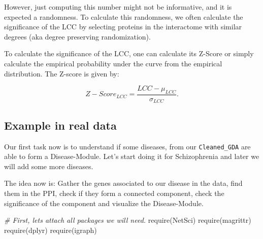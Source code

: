 \documentclass[
]{book}
\newenvironment{Shaded}{\begin{snugshade}}{\end{snugshade}}
\newcommand{\CommentTok}[1]{\textcolor[rgb]{0.56,0.35,0.01}{\textit{#1}}}
\newcommand{\FunctionTok}[1]{\textcolor[rgb]{0.00,0.00,0.00}{#1}}
\newcommand{\NormalTok}[1]{#1}
\begin{document}
However, just computing this number might not be informative, and it is expected a randomness. To calculate this randomness, we often calculate the significance of the LCC by selecting proteins in the interactome with similar degrees (aka degree preserving randomization).

To calculate the significance of the LCC, one can calculate its Z-Score or simply calculate the empirical probability under the curve from the empirical distribution. The Z-score is given by:

\[
Z-Score_{LCC} = \frac{LCC - \mu_{LCC}}{\sigma_{LCC}}.
\]

\hypertarget{example-in-real-data}{%
\subsection{Example in real data}\label{example-in-real-data}}

Our first task now is to understand if some diseases, from our \texttt{Cleaned\_GDA} are able to form a Disease-Module. Let's start doing it for Schizophrenia and later we will add some more diseases.

The idea now is: Gather the genes associated to our disease in the data, find them in the PPI, check if they form a connected component, check the significance of the component and visualize the Disease-Module.

\begin{Shaded}
\begin{Highlighting}[]
\CommentTok{\# First, let\textquotesingle{}s attach all packages we will need.}
\FunctionTok{require}\NormalTok{(NetSci)}
\FunctionTok{require}\NormalTok{(magrittr)}
\FunctionTok{require}\NormalTok{(dplyr)}
\FunctionTok{require}\NormalTok{(igraph)}
\end{Highlighting}
\end{Shaded}
\end{document}
